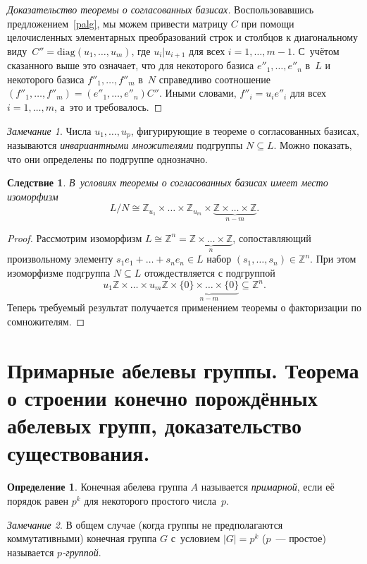 \documentclass[a4paper, 12pt]{article}
\def\ZZ{{\mathbb Z}}%
\newtheorem{corollary}{Следствие}
\theoremstyle{definition}
\newtheorem{definition}{Определение}
\theoremstyle{remark}
\newtheorem{remark}{Замечание}
\begin{document}
\begin{proof}[Доказательство теоремы о согласованных базисах]
Воспользовавшись предложением~\ref{palg}, мы можем привести матрицу
$C$ при помощи целочисленных элементарных преобразований строк и
столбцов к диагональному виду~$C'' = \text{diag}(u_1, \ldots, u_m)$,
где $u_i | u_{i+1}$ для всех $i = 1, \ldots, m-1$. С~учётом
сказанного выше это означает, что для некоторого базиса $e''_1,
\ldots, e''_n$ в~$L$ и некоторого базиса $f''_1, \ldots, f''_m$
в~$N$ справедливо соотношение $(f''_1, \ldots, f''_m) = (e''_1,
\ldots, e''_n) C''$. Иными словами, $f''_i = u_i e''_i$ для всех $i
= 1, \ldots, m$, а~это и требовалось.
\end{proof}

\begin{remark}
Числа $u_1, \ldots, u_p$, фигурирующие в теореме о согласованных
базисах, называются {\it инвариантными множителями} подгруппы $N
\subseteq L$. Можно показать, что они определены по подгруппе
однозначно.
\end{remark}

\begin{corollary}
В~условиях теоремы о согласованных базисах имеет место изоморфизм
$$
L / N \cong \ZZ_{u_1} \times \ldots \times \ZZ_{u_m} \times
\underbrace{\ZZ \times \ldots \times \ZZ}_{n - m}.
$$
\end{corollary}

\begin{proof}
Рассмотрим изоморфизм $L \cong \ZZ^n = \underbrace{\ZZ \times \ldots
\times \ZZ}_n$, сопоставляющий произвольному элементу $s_1 e_1 +
\ldots + s_n e_n \in L$ набор $(s_1, \ldots, s_n) \in \ZZ^n$. При
этом изоморфизме подгруппа $N \subseteq L$ отождествляется с
подгруппой
$$
u_1 \ZZ \times \ldots \times u_m \ZZ \times \underbrace{\lbrace 0
\rbrace \times \ldots \times \lbrace 0 \rbrace}_{n-m} \subseteq
\ZZ^n.
$$
Теперь требуемый результат получается применением теоремы о
факторизации по сомножителям.
\end{proof}


\section{Примарные абелевы группы. Теорема о строении конечно порождённых абелевых групп, доказательство существования.}

\begin{definition}
Конечная абелева группа $A$ называется {\it примарной}, если её
порядок равен $p^k$ для некоторого простого числа~$p$.
\end{definition}

\begin{remark}
В общем случае (когда группы не предполагаются коммутативными)
конечная группа $G$ с~условием $|G| = p^k$ ($p$~--- простое)
называется {\it $p$-группой}.
\end{remark}
\end{document}
